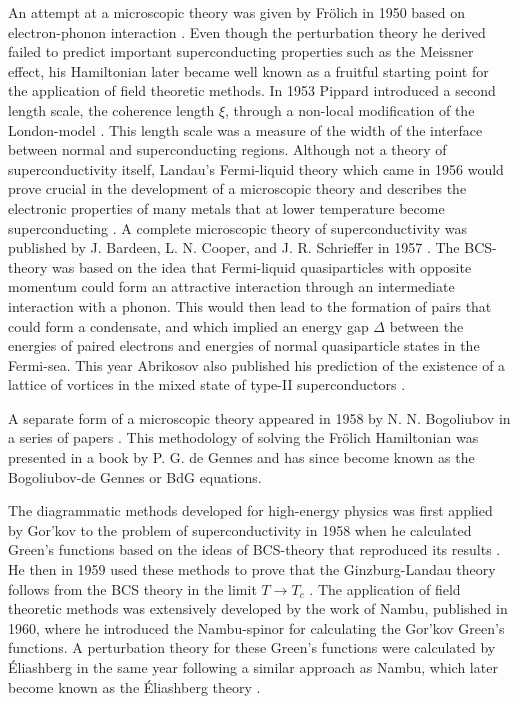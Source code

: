 An attempt at a microscopic theory was given by Fr\"olich in 1950 based on electron-phonon interaction \cite{Frolich50}. Even though the perturbation theory he derived
failed to predict important superconducting properties such as the Meissner effect, his Hamiltonian later became well known as a
fruitful starting point for the application of field theoretic methods.
In 1953 Pippard introduced a second length scale, the coherence length $\xi$, through a non-local modification of the London-model \cite{Pippard53}.
This length scale was a measure of the width of the interface between normal and superconducting regions. Although not a theory of superconductivity
itself, Landau's Fermi-liquid theory which came in 1956 would prove crucial in the development of a microscopic theory and describes the electronic
properties of many metals that at lower temperature become superconducting \cite{Landau56}. A complete microscopic theory of superconductivity was
published by J. Bardeen, L. N. Cooper, and J. R. Schrieffer in 1957 \cite{Bardeen57,BCS}. The BCS-theory was based on the idea that Fermi-liquid
quasiparticles with opposite momentum could form an attractive interaction through an intermediate interaction with a phonon. This would then lead
to the formation of pairs that could form a condensate, and which implied an energy gap $\Delta$ between the energies of paired electrons
and energies of normal quasiparticle states in the Fermi-sea. This year Abrikosov also published his prediction of the existence of a lattice of
vortices in the mixed state of type-II superconductors \cite{Abrikosov56}.

A separate form of a microscopic theory appeared in 1958 by N. N. Bogoliubov in a series of papers \cite{Bogoliubov58I, Bogoliubov58III, Bogoliubov58}.
This methodology of solving the Fr\"olich Hamiltonian was presented in a book \cite{deGennes66} by P. G. de Gennes and has since become known as
the Bogoliubov-de Gennes or BdG equations.

The diagrammatic methods developed for high-energy physics was first applied by Gor'kov to the
problem of superconductivity in 1958 when he calculated Green's functions based on the ideas of BCS-theory that reproduced
its results \cite{Gorkov58}. He then in 1959 used these methods to prove that the Ginzburg-Landau theory follows from the BCS theory in the limit $T\to T_c$ \cite{Gorkov59}.
The application of field theoretic methods was extensively developed by the work of Nambu, published in 1960, where he introduced the Nambu-spinor
for calculating the Gor'kov Green's functions. A perturbation theory for these Green's functions were calculated by \'Eliashberg in the same year
following a similar approach as Nambu, which later become known as the \'Eliashberg theory \cite{Eliashberg60}.

